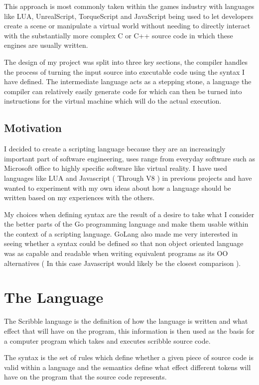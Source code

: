 \documentclass[]{final_report}
\begin{document}
This approach is most commonly taken within the games industry with languages like LUA, UnrealScript, TorqueScript and JavaScript being used to let developers create a scene or manipulate a virtual world without needing to directly interact with the substantially more complex C or C++ source code in which these engines are usually written.

The design of my project was split into three key sections, the compiler handles the process of turning the input source into executable code using the syntax I have defined. The intermediate language acts as a stepping stone, a language the compiler can relatively easily generate code for which can then be turned into instructions for the virtual machine which will do the actual execution.

\section{Motivation}

I decided to create a scripting language because they are an increasingly important part of software engineering, uses range from everyday software such as Microsoft office to highly specific software like virtual reality. I have used languages like LUA and Javascript ( Through V8 ) in previous projects and have wanted to experiment with my own ideas about how a language should be written based on my experiences with the others. 

My choices when defining syntax are the result of a desire to take what I consider the better parts of the Go programming language and make them usable within the context of a scripting language. GoLang also made me very interested in seeing whether a syntax could be defined so that non object oriented language was as capable and readable when writing equivalent programs as its OO alternatives ( In this case Javascript would likely be the closest comparison ).

\chapter{The Language}

The Scribble language is the definition of how the language is written and what effect that will have on the program, this information is then used as the basis for a computer program which takes and executes scribble source code. 

The syntax is the set of rules which define whether a given piece of source code is valid within a language and the semantics define what effect different tokens will have on the program that the source code represents.
\end{document}
